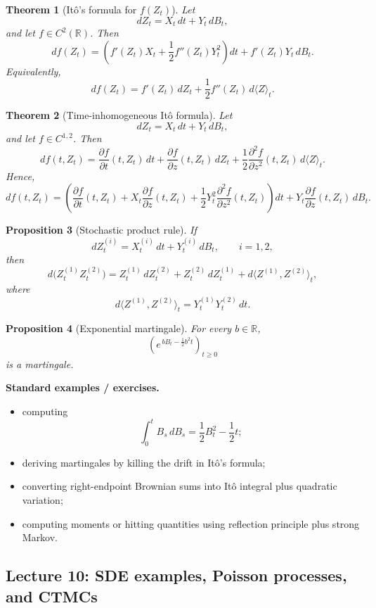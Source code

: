 \documentclass[11pt]{article}
\newtheorem{theorem}{Theorem}[section]
\newtheorem{proposition}[theorem]{Proposition}
\theoremstyle{definition}
\begin{document}
\begin{theorem}[It\^o's formula for $f(Z_t)$]
Let
\[
dZ_t=X_t\,dt+Y_t\,dB_t,
\]
and let $f\in C^2(\mathbb R)$. Then
\[
df(Z_t)
=
\left(f'(Z_t)X_t+\frac12 f''(Z_t)Y_t^2\right)dt
+
f'(Z_t)Y_t\,dB_t.
\]
Equivalently,
\[
df(Z_t)=f'(Z_t)\,dZ_t+\frac12 f''(Z_t)\,d\langle Z\rangle_t.
\]
\end{theorem}

\begin{theorem}[Time-inhomogeneous It\^o formula]
Let
\[
dZ_t=X_t\,dt+Y_t\,dB_t,
\]
and let $f\in C^{1,2}$. Then
\[
df(t,Z_t)
=
\frac{\partial f}{\partial t}(t,Z_t)\,dt
+
\frac{\partial f}{\partial z}(t,Z_t)\,dZ_t
+
\frac12\frac{\partial^2 f}{\partial z^2}(t,Z_t)\,d\langle Z\rangle_t.
\]
Hence,
\[
df(t,Z_t)
=
\left(
\frac{\partial f}{\partial t}(t,Z_t)
+
X_t\frac{\partial f}{\partial z}(t,Z_t)
+
\frac12 Y_t^2\frac{\partial^2 f}{\partial z^2}(t,Z_t)
\right)dt
+
Y_t\frac{\partial f}{\partial z}(t,Z_t)\,dB_t.
\]
\end{theorem}

\begin{proposition}[Stochastic product rule]
If
\[
dZ_t^{(i)}=X_t^{(i)}\,dt+Y_t^{(i)}\,dB_t,
\qquad i=1,2,
\]
then
\[
d\bigl(Z_t^{(1)}Z_t^{(2)}\bigr)
=
Z_t^{(1)}\,dZ_t^{(2)}
+
Z_t^{(2)}\,dZ_t^{(1)}
+
d\langle Z^{(1)},Z^{(2)}\rangle_t,
\]
where
\[
d\langle Z^{(1)},Z^{(2)}\rangle_t = Y_t^{(1)}Y_t^{(2)}\,dt.
\]
\end{proposition}

\begin{proposition}[Exponential martingale]
For every $b\in\mathbb R$,
\[
\left(e^{\,bB_t-\frac12 b^2 t}\right)_{t\ge 0}
\]
is a martingale.
\end{proposition}

\textbf{Standard examples / exercises.}
\begin{itemize}[leftmargin=2em]
    \item computing
    \[
    \int_0^t B_s\,dB_s = \frac12 B_t^2 - \frac12 t;
    \]
    \item deriving martingales by killing the drift in It\^o's formula;
    \item converting right-endpoint Brownian sums into It\^o integral plus quadratic variation;
    \item computing moments or hitting quantities using reflection principle plus strong Markov.
\end{itemize}

\subsection{Lecture 10: SDE examples, Poisson processes, and CTMCs}
\end{document}
